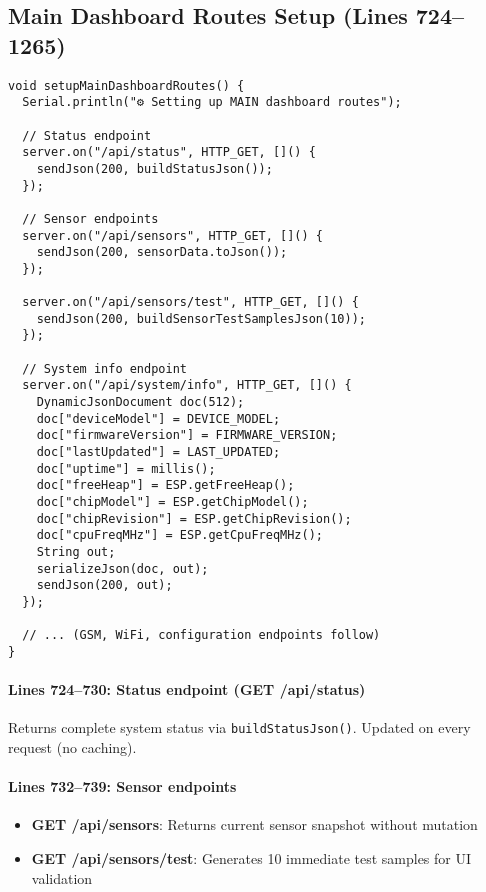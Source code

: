 \documentclass[11pt,a4paper]{article}
\begin{document}
\subsection{Main Dashboard Routes Setup (Lines 724--1265)}

\begin{verbatim}
void setupMainDashboardRoutes() {
  Serial.println("⚙ Setting up MAIN dashboard routes");
  
  // Status endpoint
  server.on("/api/status", HTTP_GET, []() { 
    sendJson(200, buildStatusJson()); 
  });
  
  // Sensor endpoints
  server.on("/api/sensors", HTTP_GET, []() {
    sendJson(200, sensorData.toJson());
  });

  server.on("/api/sensors/test", HTTP_GET, []() {
    sendJson(200, buildSensorTestSamplesJson(10));
  });
  
  // System info endpoint
  server.on("/api/system/info", HTTP_GET, []() {
    DynamicJsonDocument doc(512);
    doc["deviceModel"] = DEVICE_MODEL;
    doc["firmwareVersion"] = FIRMWARE_VERSION;
    doc["lastUpdated"] = LAST_UPDATED;
    doc["uptime"] = millis();
    doc["freeHeap"] = ESP.getFreeHeap();
    doc["chipModel"] = ESP.getChipModel();
    doc["chipRevision"] = ESP.getChipRevision();
    doc["cpuFreqMHz"] = ESP.getCpuFreqMHz();
    String out;
    serializeJson(doc, out);
    sendJson(200, out);
  });
  
  // ... (GSM, WiFi, configuration endpoints follow)
}
\end{verbatim}

\paragraph{Lines 724--730: Status endpoint (GET /api/status)}
Returns complete system status via \texttt{buildStatusJson()}. Updated on every request (no caching).

\paragraph{Lines 732--739: Sensor endpoints}
\begin{itemize}[leftmargin=*]
  \item \textbf{GET /api/sensors}: Returns current sensor snapshot without mutation
  \item \textbf{GET /api/sensors/test}: Generates 10 immediate test samples for UI validation
\end{itemize}
\end{document}
